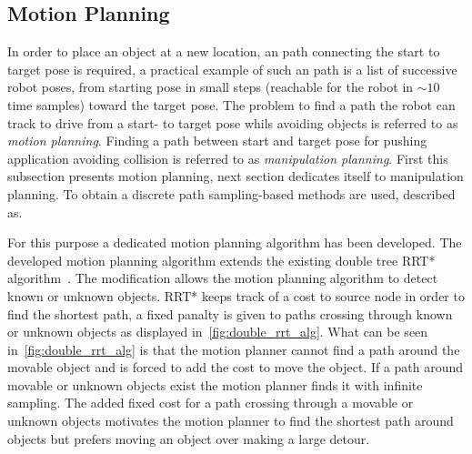 \subsection{Motion Planning}%
\label{subsec:motion_planning}

In order to place an object at a new location, an path connecting the start to target pose is required, a practical example of such an path is a list of successive robot poses, from starting pose in small steps (reachable for the robot in $\sim10$ time samples) toward the target pose. The problem to find a path the robot can track to drive from a start- to target pose whils avoiding objects is referred to as \textit{motion planning}. Finding a path between start and target pose for pushing application avoiding collision is referred to as \textit{manipulation planning}. First this subsection presents motion planning, next section dedicates itself to manipulation planning. To obtain a discrete path sampling-based methods are used, described as.\bs

\textit{}\bs

For this purpose a dedicated motion planning algorithm has been developed. The developed motion planning algorithm extends the existing double tree \ac{RRT*} algorithm~\cite{chen_fast_2018}. The modification allows the motion planning algorithm to detect known or unknown objects. \ac{RRT*} keeps track of a cost to source node in order to find the shortest path, a fixed panalty is given to paths crossing through known or unknown objects as displayed in~\cref{fig:double_rrt_alg}. What can be seen in~\cref{fig:double_rrt_alg} is that the motion planner cannot find a path around the movable object and is forced to add the cost to move the object. If a path around movable or unknown objects exist the motion planner finds it with infinite sampling. The added fixed cost for a path crossing through a movable or unknown objects motivates the motion planner to find the shortest path around objects but prefers moving an object over making a large detour.




